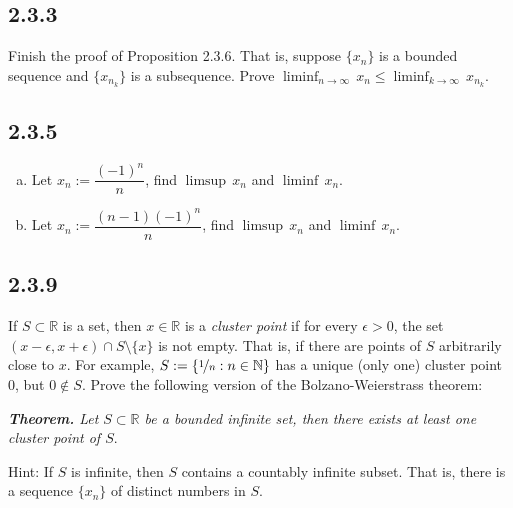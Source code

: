 \documentclass{article}
\newcommand{\R}{{\mathbb{R}}}
\newcommand{\N}{{\mathbb{N}}}
\newcommand{\myindex}[1]{#1} %
\begin{document}
\mysolution{

} %



\subsection{2.3.3}Finish the proof of Proposition 2.3.6.  That is,
suppose $\{ x_n \}$ is a bounded sequence and
$\{ x_{n_k} \}$ is a subsequence.  Prove
$\displaystyle \liminf_{n\to\infty}\, x_n \leq
\liminf_{k\to\infty}\, x_{n_k}$.

\mysolution{

} %


\subsection{2.3.5}\begin{enumerate}[a)]
\item
Let $x_n := \dfrac{{(-1)}^n}{n}$, find $\limsup \, x_n$ and $\liminf \, x_n$.
\item
Let $x_n := \dfrac{(n-1){(-1)}^n}{n}$, find $\limsup \, x_n$ and $\liminf \, x_n$.
\end{enumerate}

\mysolution{

} %


\subsection{2.3.9}If $S \subset \R$ is a set, then $x \in \R$ is a \emph{\myindex{cluster
point}}
if for every $\epsilon > 0$, the set $(x-\epsilon,x+\epsilon) \cap S
\setminus \{ x \}$ is not empty.  That is, if there are points of $S$
arbitrarily close to $x$.
For example, $S := \{ \nicefrac{1}{n} : n \in \N \}$ has a unique (only
one) cluster point $0$, but $0 \notin S$.
Prove the following version of the Bolzano-Weierstrass theorem:

\medskip

\noindent
\emph{\textbf{Theorem.} Let $S \subset \R$ be a bounded infinite set,
then there exists at least one cluster point of $S$}.

\medskip

Hint: If $S$ is infinite, then $S$ contains a countably infinite subset.
That is, there is a sequence $\{ x_n \}$ of distinct numbers in $S$.

\mysolution{

} %
\end{document}
